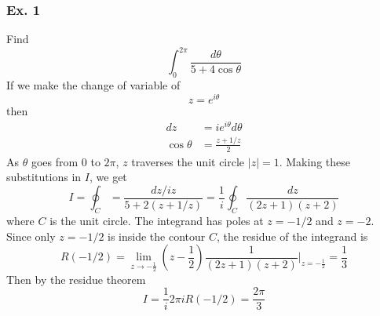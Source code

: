 \documentclass[../main.tex]{subfiles}
\begin{document}
\subsubsection*{Ex. 1} Find \begin{equation*}
    \int_{0}^{2\pi} \dfrac{d\theta}{5+4\cos \theta}
\end{equation*}
If we make the change of variable of 
\begin{equation*}
    z = e^{i\theta}
\end{equation*}
then 
\begin{align*}
    dz &= ie^{i\theta} d\theta\\
    \cos \theta&=\frac{z+1/z}{2}
\end{align*}
As $\theta$ goes from $0$ to $2\pi$, $z$ traverses the unit circle $|z| = 1$. Making these substitutions in $I$, we get
\begin{equation*}
    I=\oint_C =\frac{dz/iz}{5+2(z+1/z)}=\frac{1}{i}\oint_C\frac{dz}{(2z + 1)(z + 2)}
\end{equation*}
where $C$ is the unit circle. The integrand has poles at $z = -1/2$ and $ z = -2$. Since only $z = -1/2$ is inside the contour $C$, the residue of the integrand is 
\begin{equation*}
    R(-1/2)=\lim_{z\rightarrow -\frac{1}{2}}(z-\frac{1}{2})\frac{1}{(2z + 1)(z + 2)}\bigg|_{z=-\frac{1}{2}}=\frac{1}{3}
\end{equation*}
Then by the residue theorem
\begin{equation*}
    I=\frac{1}{i}2\pi i R(-1/2)=\frac{2\pi}{3}
\end{equation*}
\end{document}
